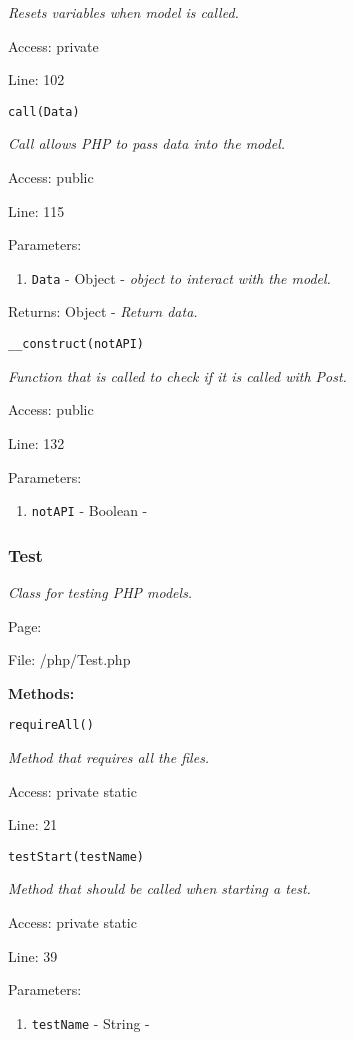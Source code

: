 {\scriptsize
\textit{Resets variables when model is called.}

Access: private

Line: 102

}

\texttt{call(Data)}

{\scriptsize
\textit{Call allows PHP to pass data into the model.}

Access: public

Line: 115

Parameters:

\begin{enumerate}
\item \texttt{Data} - Object - \textit{object to interact with the model.}
\end{enumerate}
Returns: Object - \textit{Return data.}

}

\texttt{\_\_construct(notAPI)}

{\scriptsize
\textit{Function that is called to check if it is called with Post.}

Access: public

Line: 132

Parameters:

\begin{enumerate}
\item \texttt{notAPI} - Boolean - \textit{}
\end{enumerate}
}

\subsubsection{Test}\label{Test.php.doc}
\textit{Class for testing PHP models.}

Page: \pageref{Test.php}

File: /php/Test.php

\textbf{Methods:}

\texttt{requireAll()}

{\scriptsize
\textit{Method that requires all the files.}

Access: private static

Line: 21

}

\texttt{testStart(testName)}

{\scriptsize
\textit{Method that should be called when starting a test.}

Access: private static

Line: 39

Parameters:

\begin{enumerate}
\item \texttt{testName} - String - \textit{}
\end{enumerate}
}

